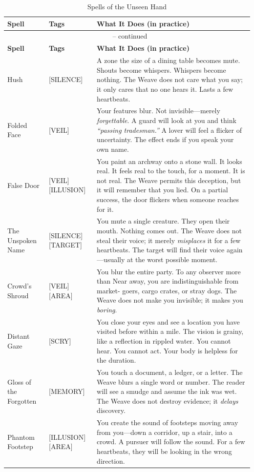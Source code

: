 \noindent
\begin{longtable}{p{} p{} p{}}
\caption{Spells of the Unseen Hand}\\
\midrule
\textbf{Spell} & \textbf{Tags} & \textbf{What It Does (in practice)}\\
\midrule
\endfirsthead
\multicolumn{3}{c}{\tablename\ \thetable{} -- continued}\\
\midrule
\textbf{Spell} & \textbf{Tags} & \textbf{What It Does (in practice)}\\
\midrule
\endhead
Hush & [SILENCE] & A zone the size of a dining table becomes mute. Shouts become whispers. Whispers become nothing. The Weave does not care what you say; it only cares that no one hears it. Lasts a few heartbeats. \\
Folded Face & [VEIL] & Your features blur. Not invisible---merely \emph{forgettable}. A guard will look at you and think \emph{``passing tradesman.''} A lover will feel a flicker of uncertainty. The effect ends if you speak your own name. \\
False Door & [VEIL][ILLUSION] & You paint an archway onto a stone wall. It looks real. It feels real to the touch, for a moment. It is not real. The Weave permits this deception, but it will remember that you lied. On a partial success, the door flickers when someone reaches for it. \\
The Unspoken Name & [SILENCE][TARGET] & You mute a single creature. They open their mouth. Nothing comes out. The Weave does not steal their voice; it merely \emph{misplaces} it for a few heartbeats. The target will find their voice again---usually at the worst possible moment. \\
Crowd's Shroud & [VEIL][AREA] & You blur the entire party. To any observer more than Near away, you are indistinguishable from market- goers, cargo crates, or stray dogs. The Weave does not make you invisible; it makes you \emph{boring}. \\
Distant Gaze & [SCRY] & You close your eyes and see a location you have visited before within a mile. The vision is grainy, like a reflection in rippled water. You cannot hear. You cannot act. Your body is helpless for the duration. \\
Gloss of the Forgotten & [MEMORY] & You touch a document, a ledger, or a letter. The Weave blurs a single word or number. The reader will see a smudge and assume the ink was wet. The Weave does not destroy evidence; it \emph{delays} discovery. \\
Phantom Footstep & [ILLUSION][AREA] & You create the sound of footsteps moving away from you---down a corridor, up a stair, into a crowd. A pursuer will follow the sound. For a few heartbeats, they will be looking in the wrong direction. \\
\hline
\end{longtable}

